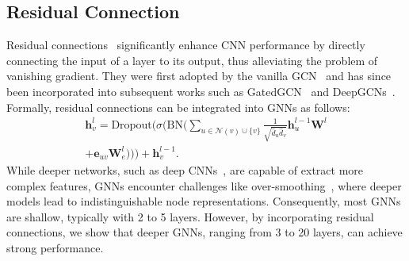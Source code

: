 \subsection{Residual Connection}
Residual connections~\cite{he2016deep} significantly enhance CNN performance by directly connecting the input of a layer to its output, thus alleviating the problem of vanishing gradient. They were first adopted by the vanilla GCN~\cite{kipf2017semisupervised} and has since been incorporated into subsequent works such as GatedGCN~\cite{bresson2017residual} and DeepGCNs~\cite{li2019deepgcns}. Formally, residual connections can be integrated into GNNs as follows:
\vspace{-0.05 in}
\begin{align}
\nonumber \boldsymbol{h}_v^l =  \text{Dropout}(\sigma(\text{BN}(  \sum_{u \in \mathcal{N}(v) \cup \{v\}} \frac{1}{\sqrt{\hat{d}_u \hat{d}_v}} \boldsymbol{h}_{u}^{l-1}\boldsymbol{W}^l \\ + 
\boldsymbol{e}_{uv}\boldsymbol{W}^l_e))) + \boldsymbol{h}_{v}^{l-1}.
\end{align} 
While deeper networks, such as deep CNNs~\cite{he2016deep,huang2017densely}, are capable of extract more complex features, GNNs encounter challenges like over-smoothing~\cite{li2018deeper}, where deeper models lead to indistinguishable node representations. Consequently, most GNNs are shallow, typically with 2 to 5 layers. However, by incorporating residual connections, we show that deeper GNNs, ranging from 3 to 20 layers, can achieve strong performance.
 
